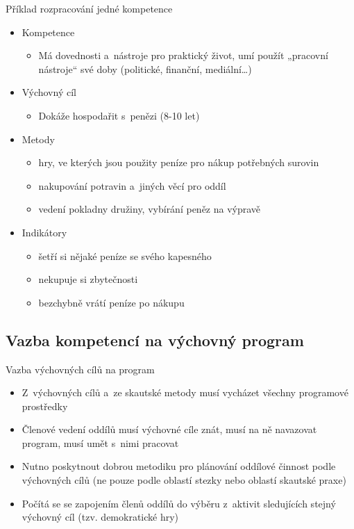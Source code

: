 \documentclass[compress,xelatex,xcolor=dvipsnames,print]{beamer}
\begin{document}
\begin{frame}{Příklad rozpracování jedné kompetence}
\begin{itemize}
\item Kompetence
 \begin{itemize}
 \item Má dovednosti a~nástroje pro praktický život, umí použít „pracovní nástroje“ své doby (politické, finanční, mediální\ldots)
 \end{itemize}
\item Výchovný cíl
 \begin{itemize}
 \item Dokáže hospodařit s~penězi (8-10 let)
 \end{itemize}
\item Metody
 \begin{itemize}
 \item hry, ve kterých jsou použity peníze pro nákup potřebných surovin
 \item nakupování potravin a~jiných věcí pro oddíl
 \item vedení pokladny družiny, vybírání peněz na výpravě
 \end{itemize}
\item Indikátory
\begin{itemize}
 \item šetří si nějaké peníze se svého kapesného
 \item nekupuje si zbytečnosti
 \item bezchybně vrátí peníze po nákupu
\end{itemize}
\end{itemize}
\end{frame}

\subsection{Vazba kompetencí na výchovný program}

\begin{frame}{Vazba výchovných cílů na program}
\begin{itemize}
\item Z~výchovných cílů a~ze skautské metody musí vycházet všechny programové prostředky
\item Členové vedení oddílů musí výchovné cíle znát, musí na ně navazovat program, musí umět s~nimi pracovat
\item Nutno poskytnout dobrou metodiku pro plánování oddílové činnost podle výchovných cílů (ne pouze podle oblastí stezky nebo oblastí skautské praxe)
\item Počítá se se zapojením členů oddílů do výběru z~aktivit sledujících stejný výchovný cíl (tzv. demokratické hry)
\end{itemize}
\end{frame}
\end{document}
